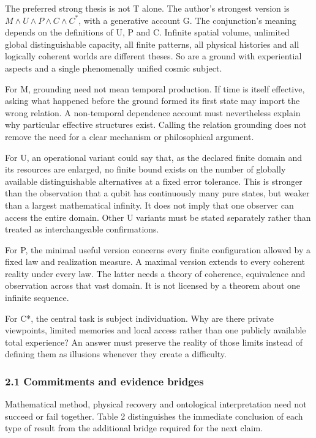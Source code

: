 \documentclass[
  10pt,
  a4paper,
]{article}
\begin{document}
The preferred strong thesis is not T alone. The author's strongest
version is \(M\land U\land P\land C\land C^{\text{*}}\), with a
generative account G. The conjunction's meaning depends on the
definitions of U, P and C. Infinite spatial volume, unlimited global
distinguishable capacity, all finite patterns, all physical histories
and all logically coherent worlds are different theses. So are a ground
with experiential aspects and a single phenomenally unified cosmic
subject.

For M, grounding need not mean temporal production. If time is itself
effective, asking what happened before the ground formed its first state
may import the wrong relation. A non-temporal dependence account must
nevertheless explain why particular effective structures exist. Calling
the relation grounding does not remove the need for a clear mechanism or
philosophical argument.

For U, an operational variant could say that, as the declared finite
domain and its resources are enlarged, no finite bound exists on the
number of globally available distinguishable alternatives at a fixed
error tolerance. This is stronger than the observation that a qubit has
continuously many pure states, but weaker than a largest mathematical
infinity. It does not imply that one observer can access the entire
domain. Other U variants must be stated separately rather than treated
as interchangeable confirmations.

For P, the minimal useful version concerns every finite configuration
allowed by a fixed law and realization measure. A maximal version
extends to every coherent reality under every law. The latter needs a
theory of coherence, equivalence and observation across that vast
domain. It is not licensed by a theorem about one infinite sequence.

For C*, the central task is subject individuation. Why are there private
viewpoints, limited memories and local access rather than one publicly
available total experience? An answer must preserve the reality of those
limits instead of defining them as illusions whenever they create a
difficulty.

\subsubsection{2.1 Commitments and evidence
bridges}\label{commitments-and-evidence-bridges}

Mathematical method, physical recovery and ontological interpretation
need not succeed or fail together. Table 2 distinguishes the immediate
conclusion of each type of result from the additional bridge required
for the next claim.
\end{document}
